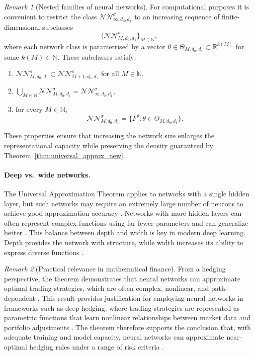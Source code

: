 \documentclass[12pt,a4paper]{article}
\theoremstyle{definition}
\theoremstyle{plain}
\theoremstyle{remark}
\newtheorem{remark}{Remark}[section]
\theoremstyle{plain}
\begin{document}
\begin{remark}[Nested families of neural networks]
\label{rem:nested_families_NN}
For computational purposes it is convenient to restrict the class 
$\mathcal{NN}^{\sigma}_{\infty,d_0,d_1}$  
to an increasing sequence of finite-dimensional subclasses
\[
    \{\mathcal{NN}^{\sigma}_{M,d_0,d_1}\}_{M\in\mathbb{N}},
\]
where each network class is parametrised by a vector 
$\theta \in \Theta_{M,d_0,d_1} \subset \mathbb{R}^{k(M)}$ for some $k(M)\in\mathbb{N}$.  
These subclasses satisfy:

\begin{enumerate}
    \item $\mathcal{NN}^{\sigma}_{M,d_0,d_1} \subset \mathcal{NN}^{\sigma}_{M+1,d_0,d_1}$ for all $M\in\mathbb{N}$,
    \item $\displaystyle \bigcup_{M\in\mathbb{N}} \mathcal{NN}^{\sigma}_{M,d_0,d_1} 
    = \mathcal{NN}^{\sigma}_{\infty,d_0,d_1}$,
    \item for every $M\in\mathbb{N}$,
    \[
        \mathcal{NN}^{\sigma}_{M,d_0,d_1}
        =
        \{ F^\theta : \theta \in \Theta_{M,d_0,d_1} \}.
    \]
\end{enumerate}

These properties ensure that increasing the network size enlarges the representational capacity while preserving the density guaranteed by Theorem~\ref{thm:universal_approx_new}.
\end{remark}

\paragraph{Deep vs.\ wide networks.}
The Universal Approximation Theorem applies to networks with a single hidden layer, but such networks may require an extremely large number of neurons to achieve good approximation accuracy \cite{Hornik1991}. 
Networks with more hidden layers can often represent complex functions using far fewer parameters and can generalize better \cite{HighamHigham2019DeepLearning}. 
This balance between depth and width is key in modern deep learning. Depth provides the network with structure, while width increases its ability to express diverse functions \cite{HighamHigham2019DeepLearning}.

\begin{remark}[Practical relevance in mathematical finance]\label{rem:practical_nn_finance}
From a hedging perspective, the theorem demonstrates that neural networks can approximate optimal trading strategies, which are often complex, nonlinear, and path-dependent \cite{Buehler2019DeepHedging,Horvath2021DeepRough,HighamHigham2019DeepLearning}. 
This result provides justification for employing neural networks in frameworks such as deep hedging, where trading strategies are represented as parametric functions that learn nonlinear relationships between market data and portfolio adjustments \cite{Buehler2019DeepHedging}. 
The theorem therefore supports the conclusion that, with adequate training and model capacity, neural networks can approximate near-optimal hedging rules under a range of risk criteria \cite{Buehler2019DeepHedging,HighamHigham2019DeepLearning}.
\end{remark}
\end{document}
